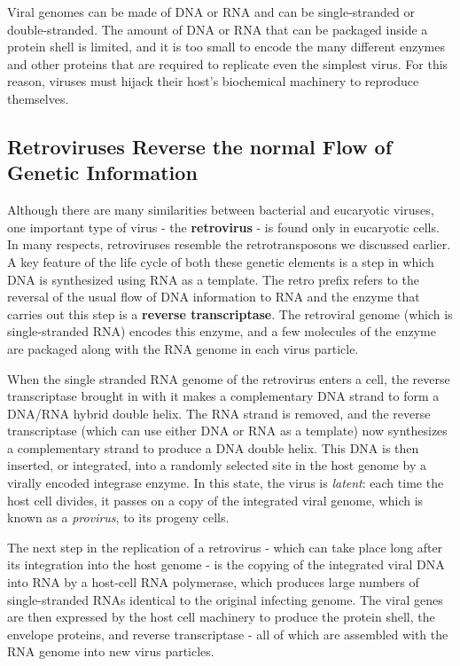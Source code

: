 Viral genomes can be made of DNA or RNA and can be single-stranded
or double-stranded. The amount of DNA or RNA that can be
packaged inside a protein shell is limited, and it is too small to encode the
many different enzymes and other proteins that are required to replicate
even the simplest virus. For this reason, viruses must hijack their host’s
biochemical machinery to reproduce themselves.

\subsection{Retroviruses Reverse the normal Flow of Genetic Information}

Although there are many similarities between bacterial and eucaryotic
viruses, one important type of virus - the \textbf{retrovirus} - is found only in
eucaryotic cells. In many respects, retroviruses resemble the retrotransposons
we discussed earlier. A key feature of the life cycle of both these
genetic elements is a step in which DNA is synthesized using RNA as a
template. The retro prefix refers to the reversal of the usual flow of DNA
information to RNA and the enzyme that carries out this
step is a \textbf{reverse transcriptase}. The retroviral genome (which is single-stranded
RNA) encodes this enzyme, and a few molecules of the enzyme
are packaged along with the RNA genome in each virus particle.

When the single stranded RNA genome of the retrovirus enters a cell, the reverse
transcriptase brought in with it makes a complementary DNA strand
to form a DNA/RNA hybrid double helix. The RNA strand is removed,
and the reverse transcriptase (which can use either DNA or RNA as a
template) now synthesizes a complementary strand to produce a DNA
double helix. This DNA is then inserted, or integrated, into a randomly
selected site in the host genome by a virally encoded integrase enzyme.
In this state, the virus is \textit{latent}: each time the host cell divides, it passes
on a copy of the integrated viral genome, which is known as a \textit{provirus},
to its progeny cells.

The next step in the replication of a retrovirus - which can take place
long after its integration into the host genome - is the copying of the
integrated viral DNA into RNA by a host-cell RNA polymerase, which
produces large numbers of single-stranded RNAs identical to the original
infecting genome. The viral genes are then expressed by the host
cell machinery to produce the protein shell, the envelope proteins, and
reverse transcriptase - all of which are assembled with the RNA genome
into new virus particles.

